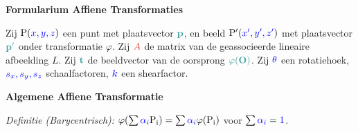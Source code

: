 \documentclass[12pt]{article}
\renewcommand{\vec}[1]{\textcolor{vectorTeal}{\mathbf{#1}}}
\newcommand{\scalar}[1]{\textcolor{scalarBrightBlue}{#1}}
\newcommand{\mat}[1]{\textcolor{matrixSoftRed}{#1}}
\newcommand{\punt}[1]{\mathrm{#1}}
\begin{document}
\begin{center}
\Large \textbf{Formularium Affiene Transformaties}
\end{center}

\vspace{1em} %

Zij $\punt{P}(\scalar{x, y, z})$ een punt met plaatsvector $\vec{p}$, en beeld $\punt{P'}(\scalar{x', y', z'})$ met plaatsvector $\vec{p'}$ onder transformatie $\varphi$.
Zij $\mat{A}$ de matrix van de geassocieerde lineaire afbeelding $L$.
Zij $\vec{t}$ de beeldvector van de oorsprong $\vec{\varphi(O)}$.
Zij $\scalar{\theta}$ een rotatiehoek, $\scalar{s_x, s_y, s_z}$ schaalfactoren, $\scalar{k}$ een shearfactor.

\vspace{1.5em} %
{\centering
\textcolor{headerBrown}{\large\textbf{Algemene Affiene Transformatie}}
\par
}%
\textit{Definitie (Barycentrisch):} $\varphi(\sum \scalar{\alpha_i} \punt{P_i}) = \sum \scalar{\alpha_i} \varphi(\punt{P_i})$ voor $\sum \scalar{\alpha_i} = \scalar{1}$.
\end{document}

